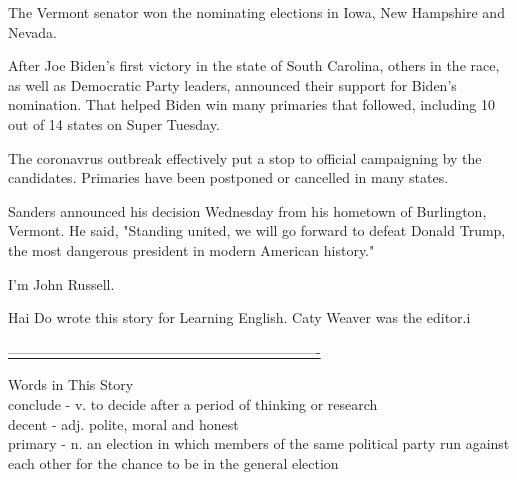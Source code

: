 The Vermont senator won the nominating elections in Iowa, New Hampshire and Nevada.

After Joe Biden's first victory in the state of South Carolina, others in the race, as well as Democratic Party leaders, announced their support for Biden's nomination. That helped Biden win many primaries that followed, including 10 out of 14 states on Super Tuesday.

The coronavrus outbreak effectively put a stop to official campaigning by the candidates. Primaries have been postponed or cancelled in many states.

Sanders announced his decision Wednesday from his hometown of Burlington, Vermont. He said, "Standing united, we will go forward to defeat Donald Trump, the most dangerous president in modern American history."

I'm John Russell.

Hai Do wrote this story for Learning English. Caty Weaver was the editor.i

\underline{-------------------------------------------------------------------}

Words in This Story \\

conclude - v. to decide after a period of thinking or research \\

decent - adj. polite, moral and honest \\

primary - n. an election in which members of the same political party run against each other for the chance to be in the general election \\



